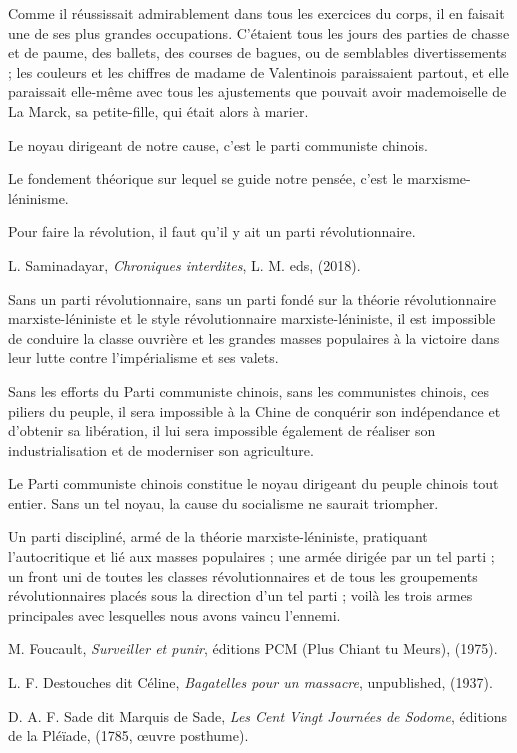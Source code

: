 \documentclass[a4paper,footinbib,final,openany,final,12pt]{book}
\begin{document}
Comme il r{\'{e}}ussissait admirablement dans tous les exercices du corps, il en faisait une de ses plus grandes occupations. C'{\'{e}}taient tous les jours des parties de chasse et de paume, des ballets, des courses de bagues, ou de semblables divertissements ; les couleurs et les chiffres de madame de Valentinois paraissaient partout, et elle paraissait elle-m{\^{e}}me avec tous les ajustements que pouvait avoir mademoiselle de La Marck, sa petite-fille, qui {\'{e}}tait alors {\`{a}} marier.


\begin{thebibliography}{99}
  
Le noyau dirigeant de notre cause, c'est le parti communiste chinois.
 
 Le fondement th{\'{e}}orique sur lequel se guide notre pens{\'{e}}e, c'est le marxisme-l{\'{e}}ninisme.
  
Pour faire la r{\'{e}}volution, il faut qu'il y ait un parti r{\'{e}}volutionnaire.

L. Saminadayar, \og \emph{Chroniques interdites}\fg, L. M. eds, (2018).
  
Sans un parti r{\'{e}}volutionnaire, sans un parti fond{\'{e}} sur la th{\'{e}}orie r{\'{e}}volutionnaire marxiste-l{\'{e}}niniste et le style r{\'{e}}volutionnaire marxiste-l{\'{e}}niniste, il est impossible de conduire la classe ouvri{\`{e}}re et les grandes masses populaires {\`{a}} la victoire dans leur lutte contre l'imp{\'{e}}rialisme et ses valets.
  
Sans les efforts du Parti communiste chinois, sans les communistes chinois, ces piliers du peuple, il sera impossible {\`{a}} la Chine de conqu{\'{e}}rir son ind{\'{e}}pendance et d'obtenir sa lib{\'{e}}ration, il lui sera impossible {\'{e}}galement de r{\'{e}}aliser son industrialisation et de moderniser son agriculture.
  
Le Parti communiste chinois constitue le noyau dirigeant du peuple chinois tout entier. Sans un tel noyau, la cause du socialisme ne saurait triompher.
  
Un parti disciplin{\'{e}}, arm{\'{e}} de la th{\'{e}}orie marxiste-l{\'{e}}niniste, pratiquant l'autocritique et li{\'{e}} aux masses populaires ; une arm{\'{e}}e dirig{\'{e}}e par un tel parti ; un front uni de toutes les classes r{\'{e}}volutionnaires et de tous les groupements r{\'{e}}volutionnaires plac{\'{e}}s sous la direction d'un tel parti ; voil{\`{a}} les trois armes principales avec lesquelles nous avons vaincu l'ennemi.

M. Foucault, \og \emph{Surveiller et punir}\fg, {\'{e}}ditions PCM (Plus Chiant tu Meurs), (1975).

L. F. Destouches dit C{\'{e}}line, \og \emph{Bagatelles pour un massacre}\fg, unpublished, (1937).

D. A. F. Sade dit Marquis de Sade, \og \emph{Les Cent Vingt Journ{\'{e}}es de Sodome}\fg, {\'{e}}ditions de la Pl{\'{e}}{\"{i}}ade, (1785, {\oe}uvre posthume).

 \end{thebibliography}
\end{document}
